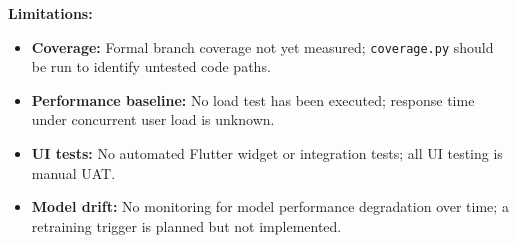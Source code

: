 \textbf{Limitations:}
\begin{itemize}
  \item \textbf{Coverage:} Formal branch coverage not yet measured;
        \texttt{coverage.py} should be run to identify untested code paths.
  \item \textbf{Performance baseline:} No load test has been executed;
        response time under concurrent user load is unknown.
  \item \textbf{UI tests:} No automated Flutter widget or integration tests;
        all UI testing is manual UAT.
  \item \textbf{Model drift:} No monitoring for model performance degradation
        over time; a retraining trigger is planned but not implemented.
\end{itemize}

